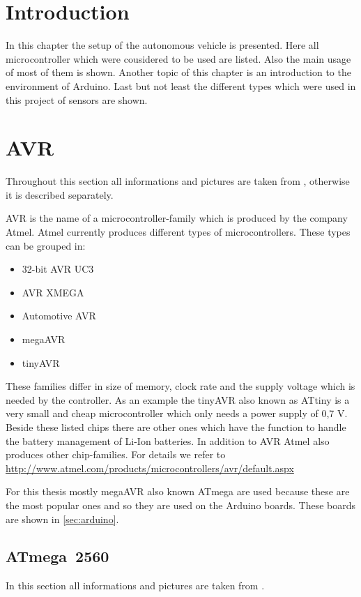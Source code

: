 \section{Introduction} \label{sec:environmentIntroduction}
In this chapter the setup of the autonomous vehicle is presented. 
Here all microcontroller which were cousidered to be used are listed.
Also the main usage of most of them is shown.
Another topic of this chapter is an introduction to the environment of Arduino.
Last but not least the different types which were used in this project of sensors are shown.

\section{AVR} \label{sec:AVR}
Throughout this section all informations and pictures are taken from \cite{web:Atmel}, otherwise it is described separately.

AVR is the name of a microcontroller-family which is produced by the company Atmel.
Atmel currently produces different types of microcontrollers.
These types can be grouped in:

\begin{itemize}
\item 32-bit AVR UC3
\item AVR XMEGA
\item Automotive AVR
\item megaAVR
\item tinyAVR
\end{itemize}

These families differ in size of memory, clock rate and the supply voltage which is needed by the controller.
As an example the tinyAVR also known as ATtiny is a very small and cheap microcontroller which only needs a power supply of 0,7 V.
Beside these listed chips there are other ones which have the function to handle the battery management of Li-Ion batteries.
In addition to AVR Atmel also produces other chip-families.
For details we refer to \url{ http://www.atmel.com/products/microcontrollers/avr/default.aspx }

For this thesis mostly megaAVR also known ATmega are used because these are the most popular ones and so they are used on the Arduino boards.
These boards are shown in \ref{sec:arduino}.

\subsection{ATmega~2560} \label{sec:atmega2560}
In this section all informations and pictures are taken from \cite{manual:atmega2560}.

